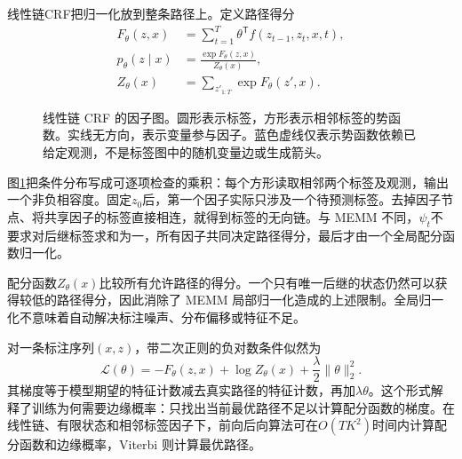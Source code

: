 线性链CRF把归一化放到整条路径上。定义路径得分
\begin{align}
 F_\theta(z,x)&=\sum_{t=1}^{T}\theta^{\mathsf T}f(z_{t-1},z_t,x,t),\\
 p_\theta(z\mid x)&=\frac{\exp F_\theta(z,x)}{Z_\theta(x)},\\
 Z_\theta(x)&=\sum_{z'_{1:T}}\exp F_\theta(z',x).
\end{align}
\begin{figure}[htbp]
\centering
{}
\caption{线性链 CRF 的因子图。圆形表示标签，方形表示相邻标签的势函数。实线无方向，表示变量参与因子。蓝色虚线仅表示势函数依赖已给定观测，不是标签图中的随机变量边或生成箭头。}
\label{fig:bayes-crf-structure}
\end{figure}
图\ref{fig:bayes-crf-structure}把条件分布写成可逐项检查的乘积：每个方形读取相邻两个标签及观测，输出一个非负相容度。固定$z_0$后，第一个因子实际只涉及一个待预测标签。去掉因子节点、将共享因子的标签直接相连，就得到标签的无向链。与 MEMM 不同，$\psi_t$不要求对后继标签求和为一，所有因子共同决定路径得分，最后才由一个全局配分函数归一化。

配分函数$Z_\theta(x)$比较所有允许路径的得分。一个只有唯一后继的状态仍然可以获得较低的路径得分，因此消除了 MEMM 局部归一化造成的上述限制。全局归一化不意味着自动解决标注噪声、分布偏移或特征不足。

对一条标注序列$(x,z)$，带二次正则的负对数条件似然为
\begin{equation}
 \mathcal L(\theta)=-F_\theta(z,x)+\log Z_\theta(x)
 +\frac{\lambda}{2}\|\theta\|_2^2.
\end{equation}
其梯度等于模型期望的特征计数减去真实路径的特征计数，再加$\lambda\theta$。这个形式解释了训练为何需要边缘概率：只找出当前最优路径不足以计算配分函数的梯度。在线性链、有限状态和相邻标签因子下，前向后向算法可在$O(TK^2)$时间内计算配分函数和边缘概率，Viterbi 则计算最优路径。

